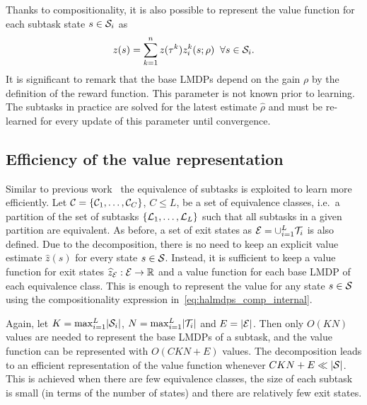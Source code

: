 Thanks to compositionality, it is also possible to represent the value function for each subtask state $s\in\mathcal{S}_i$ as
\begin{equation}
  z(s) = \sum_{k=1}^n z(\tau^k) z_i^k(s;\rho)\;\;\forall s\in\mathcal{S}_i.
  \label{eq:halmdps_comp_internal}
\end{equation}
It is significant to remark that the base LMDPs depend on the gain $\rho$ by the definition of the reward function. This parameter is not known prior to learning. The subtasks in practice are solved for the latest estimate $\widehat\rho$ and must be re-learned for every update of this parameter until convergence.
\subsection{Efficiency of the value representation}
 Similar to previous work~\citep{Wen2020,Infante2022} the equivalence of subtasks is exploited to learn more efficiently. Let $\mathcal{C}=\{\mathcal{C}_1,\ldots,\mathcal{C}_C\}$, $C\leq L$, be a set of equivalence classes, i.e.~a partition of the set of subtasks $\{\mathcal{L}_1,\ldots,\mathcal{L}_L\}$ such that all subtasks in a given partition are equivalent.
As before, a set of exit states as $\mathcal{E}=\cup_{i=1}^L\mathcal{T}_i$ is also defined.
Due to the decomposition, there is no need to keep an explicit value estimate $\widehat z(s)$ for every state $s\in\mathcal{S}$. Instead, it is sufficient to keep a value function for exit states $\widehat z_{\mathcal{E}}: \mathcal{E}\rightarrow\mathbb{R}$ and a value function for each base LMDP of each equivalence class. This is enough to represent the value for any state $s\in\mathcal{S}$ using the compositionality expression in~\eqref{eq:halmdps_comp_internal}.

Again, let $K=\max_{i=1} ^L\lvert\mathcal{S}_i\rvert$,  $N=\max_{i=1} ^L\lvert\mathcal{T}_i\rvert$ and $E=\lvert\mathcal{E}\rvert$. Then only $O(KN)$ values are needed to represent the base LMDPs of a subtask, and the value function can be represented with $O(CKN + E)$ values. The decomposition leads to an efficient representation of the value function whenever $CKN + E \ll \lvert\mathcal{S}\rvert$. This is achieved when there are few equivalence classes, the size of each subtask is small (in terms of the number of states) and there are relatively few exit states.


